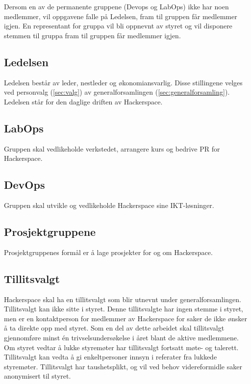 Dersom en av de permanente gruppene (Devops og LabOps) ikke har
noen medlemmer, vil oppgavene falle på Ledelsen, fram til gruppen får
medlemmer igjen. En representant for gruppa vil bli oppnevnt av styret og
vil disponere stemmen til gruppa fram til gruppen får medlemmer igjen.


\subsection{Ledelsen}\label{sec:struktur:ledelsen}
Ledelsen består av leder, nestleder og økonomiansvarlig.
Disse stillingene velges ved personvalg (\ref{sec:valg}) av generalforsamlingen (\ref{sec:generalforsamling}).
Ledelsen står for den daglige driften av Hackerspace.

\subsection{LabOps}\label{sec:struktur:labops}
Gruppen skal vedlikeholde verkstedet, arrangere kurs og bedrive PR for Hackerspace.

\subsection{DevOps}\label{sec:struktur:devops}
Gruppen skal utvikle og vedlikeholde Hackerspace sine IKT-løsninger.

\subsection{Prosjektgruppene}\label{sec:struktur:prosjektgruppene}
Prosjektgruppenes formål er å lage prosjekter for og om Hackerspace.

\subsection{Tillitsvalgt}\label{sec:struktur:tillitsvalgt}
Hackerspace skal ha en tillitsvalgt som blir utnevnt under generalforsamlingen. Tillitsvalgt kan ikke sitte i styret.
Denne tillitsvalgte har ingen stemme i styret, men er en kontaktperson for medlemmer av Hackerspace for saker de ikke ønsker å ta direkte opp med styret.
Som en del av dette arbeidet skal tillitsvalgt gjennomføre minst én trivselsundersøkelse i året blant de aktive medlemmene.
Om styret vedtar å lukke styremøter har tillitsvalgt fortsatt møte- og talerett.
Tillitsvalgt kan vedta å gi enkeltpersoner innsyn i referater fra lukkede styremøter.
Tillitsvalgt har taushetsplikt, og vil ved behov videreformidle saker anonymisert til styret.

